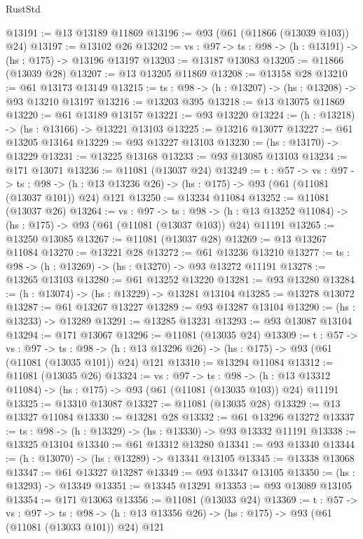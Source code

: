 \begin{lexlean}{RustStd}
\begin{coremodule}
@13191 := @13 @13189 @11869
@13196 := @93 (@61 (@11866 (@13039 @103)) @24)
@13197 := @13102 @26
@13202 := {vs : @97} -> {ts : @98} -> (h : @13191) -> (hs : @175) -> @13196 @13197
@13203 := @13187 @13083
@13205 := @11866 (@13039 @28)
@13207 := @13 @13205 @11869
@13208 := @13158 @28
@13210 := @61 @13173 @13149
@13215 := {ts : @98} -> (h : @13207) -> (hs : @13208) -> @93 @13210 @13197
@13216 := @13203 @395
@13218 := @13 @13075 @11869
@13220 := @61 @13189 @13157
@13221 := @93 @13220
@13224 := (h : @13218) -> (hs : @13166) -> @13221 @13103
@13225 := @13216 @13077
@13227 := @61 @13205 @13164
@13229 := @93 @13227 @13103
@13230 := (hs : @13170) -> @13229
@13231 := @13225 @13168
@13233 := @93 @13085 @13103
@13234 := @171 @13071
@13236 := @11081 (@13037 @24)
@13249 := {t : @57} ->
  {vs : @97} ->
  {ts : @98} -> (h : @13 @13236 @26) -> (hs : @175) -> @93 (@61 (@11081 (@13037 @101)) @24) @121
@13250 := @13234 @11084
@13252 := @11081 (@13037 @26)
@13264 := {vs : @97} ->
  {ts : @98} ->
  (h : @13 @13252 @11084) -> (hs : @175) -> @93 (@61 (@11081 (@13037 @103)) @24) @11191
@13265 := @13250 @13085
@13267 := @11081 (@13037 @28)
@13269 := @13 @13267 @11084
@13270 := @13221 @28
@13272 := @61 @13236 @13210
@13277 := {ts : @98} -> (h : @13269) -> (hs : @13270) -> @93 @13272 @11191
@13278 := @13265 @13103
@13280 := @61 @13252 @13220
@13281 := @93 @13280
@13284 := (h : @13074) -> (hs : @13229) -> @13281 @13104
@13285 := @13278 @13072
@13287 := @61 @13267 @13227
@13289 := @93 @13287 @13104
@13290 := (hs : @13233) -> @13289
@13291 := @13285 @13231
@13293 := @93 @13087 @13104
@13294 := @171 @13067
@13296 := @11081 (@13035 @24)
@13309 := {t : @57} ->
  {vs : @97} ->
  {ts : @98} -> (h : @13 @13296 @26) -> (hs : @175) -> @93 (@61 (@11081 (@13035 @101)) @24) @121
@13310 := @13294 @11084
@13312 := @11081 (@13035 @26)
@13324 := {vs : @97} ->
  {ts : @98} ->
  (h : @13 @13312 @11084) -> (hs : @175) -> @93 (@61 (@11081 (@13035 @103)) @24) @11191
@13325 := @13310 @13087
@13327 := @11081 (@13035 @28)
@13329 := @13 @13327 @11084
@13330 := @13281 @28
@13332 := @61 @13296 @13272
@13337 := {ts : @98} -> (h : @13329) -> (hs : @13330) -> @93 @13332 @11191
@13338 := @13325 @13104
@13340 := @61 @13312 @13280
@13341 := @93 @13340
@13344 := (h : @13070) -> (hs : @13289) -> @13341 @13105
@13345 := @13338 @13068
@13347 := @61 @13327 @13287
@13349 := @93 @13347 @13105
@13350 := (hs : @13293) -> @13349
@13351 := @13345 @13291
@13353 := @93 @13089 @13105
@13354 := @171 @13063
@13356 := @11081 (@13033 @24)
@13369 := {t : @57} ->
  {vs : @97} ->
  {ts : @98} -> (h : @13 @13356 @26) -> (hs : @175) -> @93 (@61 (@11081 (@13033 @101)) @24) @121

\end{coremodule}
\end{lexlean}
